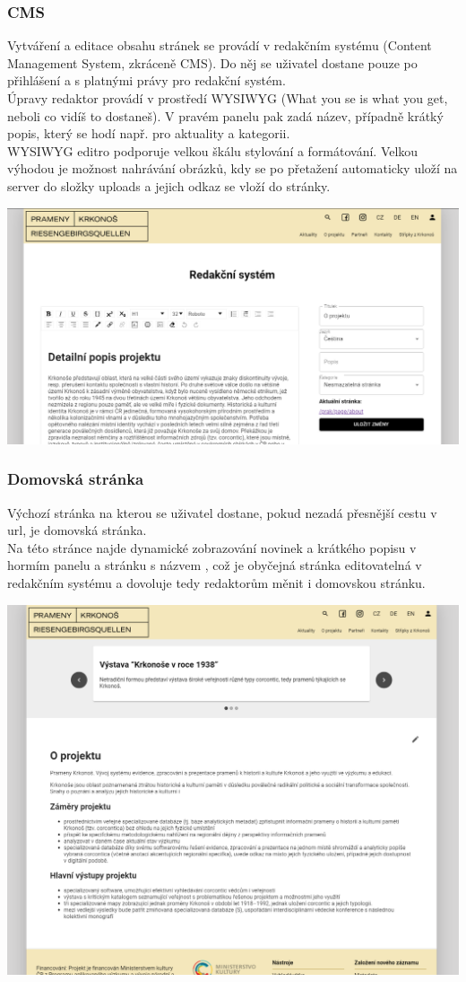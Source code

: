 \subsubsection{CMS}
Vytváření a editace obsahu stránek se provádí v redakčním systému (Content Management System, zkráceně CMS).
Do něj se uživatel dostane pouze po přihlášení a s platnými právy pro redakční systém.\\
Úpravy redaktor provádí v prostředí WYSIWYG (What you se is what you get, neboli co vidíš to dostaneš).
V pravém panelu pak zadá název, případně krátký popis, který se hodí např. pro aktuality a kategorii.\\
WYSIWYG editro podporuje velkou škálu stylování a formátování. Velkou výhodou je možnost nahrávání obrázků,
kdy se po přetažení automaticky uloží na server do složky uploads a jejich odkaz se vloží do stránky.
\begin{center}
	\includegraphics[width=.8\textwidth]{img/cmsScene.png}
\end{center}

\subsubsection{Domovská stránka}
Výchozí stránka na kterou se uživatel dostane, pokud nezadá přesnější cestu v url, je domovská stránka.\\
Na této stránce najde dynamické zobrazování novinek a krátkého popisu v hormím panelu a stránku
s názvem , což je obyčejná stránka editovatelná v redakčním systému a dovoluje tedy
redaktorům měnit i domovskou stránku.
\begin{center}
	\includegraphics[width=.8\linewidth]{img/homeScene.png}
\end{center}

